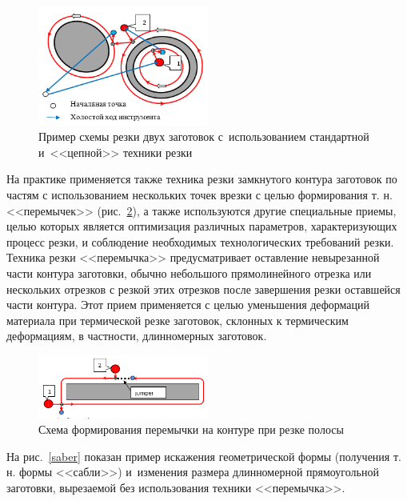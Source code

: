 \documentclass[11pt,twoside,openany]{report}
\begin{document}
\begin{figure}[h]
  \begin{center}
  \includegraphics[width=0.5\textwidth]{chain.png}
  \caption{
    Пример схемы резки двух заготовок
    с~использованием стандартной
    и~<<цепной>> техники резки}
  \label{chain}
  \end{center}
\end{figure}

На практике применяется также техника резки
замкнутого контура заготовок по частям
с использованием нескольких точек врезки
с целью формирования т. н. <<перемычек>>
(рис.~\ref{jumper}),
а также используются другие специальные приемы,
целью которых является оптимизация различных параметров,
характеризующих процесс резки,
и соблюдение необходимых технологических требований резки.
Техника резки <<перемычка>> предусматривает
оставление невырезанной части контура заготовки,
обычно небольшого прямолинейного отрезка или нескольких отрезков
с резкой этих отрезков после завершения резки оставшейся части контура.
Этот прием применяется с целью уменьшения деформаций материала
при термической резке заготовок, склонных к термическим деформациям,
в частности, длинномерных заготовок.

\begin{figure}[h]
  \begin{center}
  \includegraphics[width=0.5\textwidth]{jumper.png}
  \caption{Схема формирования перемычки на контуре при резке полосы}
  \label{jumper}
  \end{center}
\end{figure}

На рис.~\ref{saber} показан пример искажения геометрической формы
(получения т. н. формы <<сабли>>)
и~изменения размера длинномерной прямоугольной заготовки,
вырезаемой без использования техники <<перемычка>>.
\end{document}
